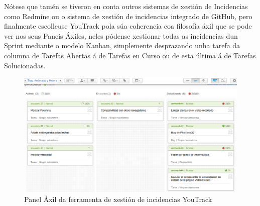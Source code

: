     Nótese que tamén se tiveron en conta outros sistemas de xestión de Incidencias como Redmine ou
    o sistema de xestión de incidencias integrado de GitHub, pero finalmente escolleuse YouTrack 
    pola súa coherencia coa filosofía áxil que se pode ver nos seus Paneis Áxiles, neles pódense
    xestionar todas as incidencias dun Sprint mediante o modelo Kanban, simplemente desprazando unha
    tarefa da columna de Tarefas Abertas á de Tarefas en Curso ou de esta última á de Tarefas 
    Solucionadas.
    
    \begin{figure}[htp]
    \begin{center}
        \includegraphics[scale=0.4]{figures/AgilePanel.png}
        \caption{Panel Áxil da ferramenta de xestión de incidencias YouTrack}
    \label{fig:AgilePanel}
    \end{center}
    \end{figure}
    
    
    

